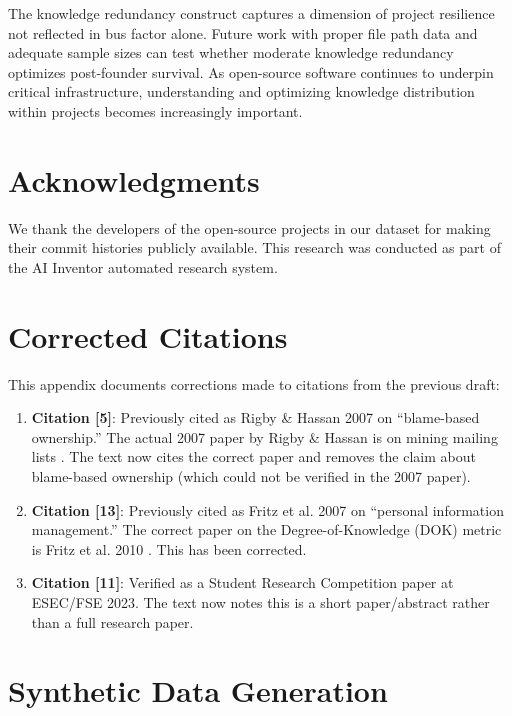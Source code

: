 \documentclass[11pt,letterpaper]{article}
\begin{document}
The knowledge redundancy construct captures a dimension of project resilience not reflected in bus factor alone. Future work with proper file path data and adequate sample sizes can test whether moderate knowledge redundancy optimizes post-founder survival. As open-source software continues to underpin critical infrastructure, understanding and optimizing knowledge distribution within projects becomes increasingly important.

\section*{Acknowledgments}

We thank the developers of the open-source projects in our dataset for making their commit histories publicly available. This research was conducted as part of the AI Inventor automated research system.




\appendix

\section{Corrected Citations}
\label{sec:datalimitation}

This appendix documents corrections made to citations from the previous draft:

\begin{enumerate}
    \item \textbf{Citation [5]}: Previously cited as Rigby \& Hassan 2007 on ``blame-based ownership.'' The actual 2007 paper by Rigby \& Hassan is on mining mailing lists \cite{Rigby2007}. The text now cites the correct paper and removes the claim about blame-based ownership (which could not be verified in the 2007 paper).
    
    \item \textbf{Citation [13]}: Previously cited as Fritz et al. 2007 on ``personal information management.'' The correct paper on the Degree-of-Knowledge (DOK) metric is Fritz et al. 2010 \cite{Fritz2010}. This has been corrected.
    
    \item \textbf{Citation [11]}: Verified as a Student Research Competition paper at ESEC/FSE 2023. The text now notes this is a short paper/abstract rather than a full research paper.
\end{enumerate}

\section{Synthetic Data Generation}
\end{document}
